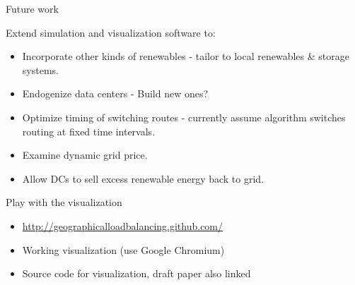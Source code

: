 \documentclass[xcolor=dvipsnames]{beamer}
\begin{document}
\summaryframe

\begin{frame}{Future work}

Extend simulation and visualization software to:

\begin{itemize}
\item Incorporate other kinds of renewables - tailor to local renewables \& storage systems.
\item Endogenize data centers - Build new ones? 
\item Optimize timing of switching routes - currently assume algorithm switches routing at fixed time intervals. 
\item Examine dynamic grid price.  
\item Allow DCs to sell excess renewable energy back to grid.
\end{itemize}

\end{frame}


\begin{frame}{Play with the visualization}
\begin{itemize}
	\item \url{http://geographicalloadbalancing.github.com/}
	\item Working visualization (use Google Chromium)
	\item Source code for visualization, draft paper also linked
\end{itemize}
\end{frame}
\end{document}
